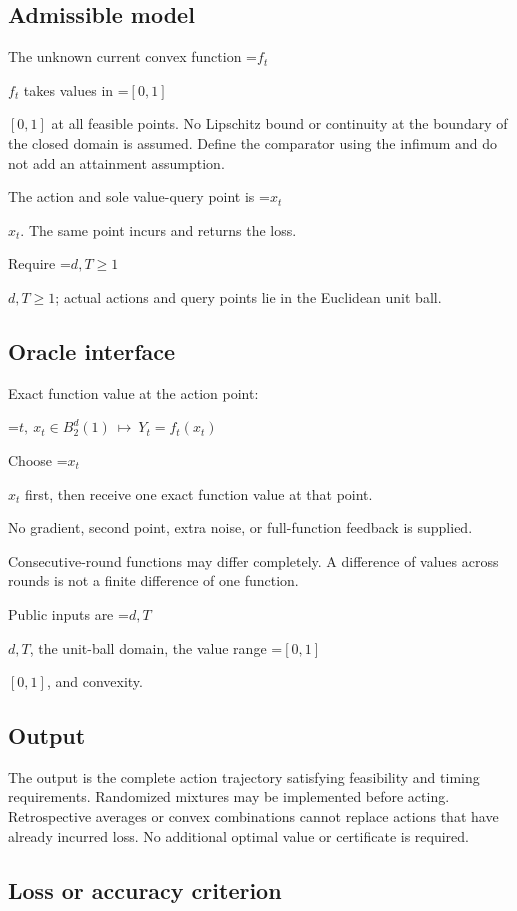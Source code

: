 \documentclass[10pt,a4paper]{article}
\newcommand{\AtlasMath}[1]{\par\begingroup\centering\setbox0=\hbox{$\displaystyle #1$}\ifdim\wd0>1.4\linewidth\typeout{ATLAS WIDE FORMULA: \the\wd0}\fi\ifdim\wd0>\linewidth\resizebox{\linewidth}{!}{\box0}\else\box0\fi\par\endgroup}
\newcommand{\AtlasInlineMath}[1]{\begingroup\setbox0=\hbox{$#1$}\ifdim\wd0>.4\linewidth\endgroup\AtlasMath{#1}\else\endgroup$#1$\fi}
\begin{document}
\subsection{Admissible model}
The unknown current convex function \AtlasInlineMath{f_t} takes values in \AtlasInlineMath{[0,1]} at all feasible points. No Lipschitz bound or continuity at the boundary of the closed domain is assumed. Define the comparator using the infimum and do not add an attainment assumption.

The action and sole value-query point is \AtlasInlineMath{x_t}. The same point incurs and returns the loss.

Require \AtlasInlineMath{d,T\ge1}; actual actions and query points lie in the Euclidean unit ball.

\subsection{Oracle interface}
Exact function value at the action point:


\AtlasMath{t,\ x_t\in B_2^d(1)\ \longmapsto\ Y_t=f_t(x_t)}


Choose \AtlasInlineMath{x_t} first, then receive one exact function value at that point.

No gradient, second point, extra noise, or full-function feedback is supplied.

Consecutive-round functions may differ completely. A difference of values across rounds is not a finite difference of one function.

Public inputs are \AtlasInlineMath{d,T}, the unit-ball domain, the value range \AtlasInlineMath{[0,1]}, and convexity.

\subsection{Output}
The output is the complete action trajectory satisfying feasibility and timing requirements. Randomized mixtures may be implemented before acting. Retrospective averages or convex combinations cannot replace actions that have already incurred loss. No additional optimal value or certificate is required.

\subsection{Loss or accuracy criterion}
\end{document}
